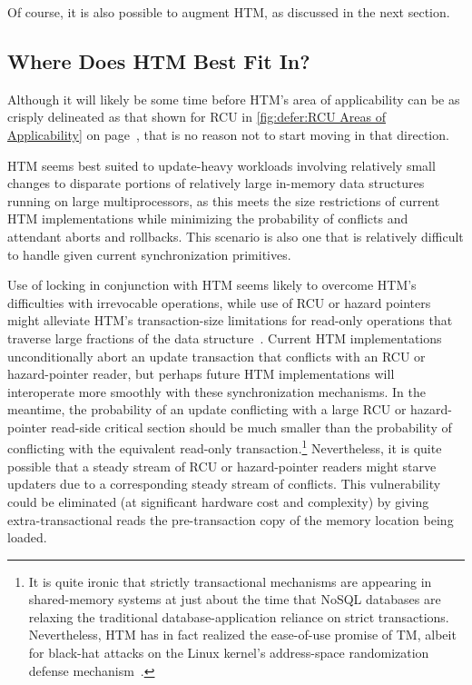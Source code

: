 Of course, it is also possible to augment HTM,
as discussed in the next section.

\subsection{Where Does HTM Best Fit In?}
\label{sec:future:Where Does HTM Best Fit In?}

Although it will likely be some time before HTM's area of applicability
can be as crisply delineated as that shown for RCU in
\cref{fig:defer:RCU Areas of Applicability} on
page~\pageref{fig:defer:RCU Areas of Applicability}, that is no reason not to
start moving in that direction.

HTM seems best suited to update-heavy workloads involving relatively
small changes to disparate portions of relatively large in-memory
data structures running on large multiprocessors,
as this meets the size restrictions of current HTM implementations while
minimizing the probability of conflicts and attendant aborts and
rollbacks.
This scenario is also one that is relatively difficult to handle given
current synchronization primitives.

Use of locking in conjunction with HTM seems likely to overcome HTM's
difficulties with irrevocable operations, while use of RCU or
hazard pointers might alleviate HTM's transaction-size limitations
for read-only operations that traverse large fractions of the data
structure~\cite{SeongJaePark2020HTMRCUlock}.
Current HTM implementations unconditionally abort an update transaction
that conflicts with an RCU or hazard-pointer reader, but perhaps future
HTM implementations will interoperate more smoothly with these
synchronization mechanisms.
In the meantime, the probability of an update conflicting with a
large RCU or hazard-pointer read-side critical section should be
much smaller than the probability of conflicting with the equivalent
read-only transaction.\footnote{
	It is quite ironic that strictly transactional mechanisms are
	appearing in shared-memory systems at just about the time
	that NoSQL databases are relaxing the traditional
	database-application reliance on strict transactions.
	Nevertheless, HTM has in fact realized the ease-of-use promise
	of TM, albeit for black-hat attacks on the Linux kernel's
	address-space randomization defense
	mechanism~\cite{YeongjinJang2016TSXbreakKASLR,Jang:2016:BKA:2976749.2978321}.}
Nevertheless, it is quite possible that a steady stream of RCU or
hazard-pointer readers might starve updaters due to a corresponding
steady stream of conflicts.
This vulnerability could be eliminated (at significant
hardware cost and complexity) by giving extra-transactional
reads the pre-transaction copy of the memory location being loaded.

